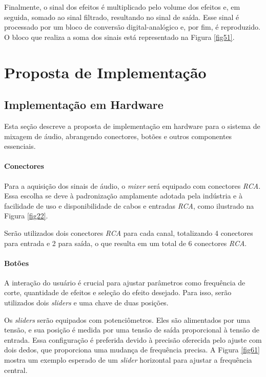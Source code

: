 Finalmente, o sinal dos efeitos é multiplicado pelo volume dos efeitos e, em seguida, somado ao sinal filtrado, resultando no sinal de saída. Esse sinal é processado por um bloco de conversão digital-analógico e, por fim, é reproduzido. O bloco que realiza a soma dos sinais está representado na Figura \ref{fig51}.

\section{Proposta de Implementação}

\subsection{Implementação em Hardware}

Esta seção descreve a proposta de implementação em hardware para o sistema de mixagem de áudio, abrangendo conectores, botões e outros componentes essenciais.

\paragraph{Conectores}
Para a aquisição dos sinais de áudio, o \textit{mixer} será equipado com conectores \textit{RCA}. Essa escolha se deve à padronização amplamente adotada pela indústria e à facilidade de uso e disponibilidade de cabos e entradas \textit{RCA}, como ilustrado na Figura \ref{fig22}.

Serão utilizados dois conectores \textit{RCA} para cada canal, totalizando 4 conectores para entrada e 2 para saída, o que resulta em um total de 6 conectores \textit{RCA}.

\paragraph{Botões}
A interação do usuário é crucial para ajustar parâmetros como frequência de corte, quantidade de efeitos e seleção do efeito desejado. Para isso, serão utilizados dois \textit{sliders} e uma chave de duas posições.

Os \textit{sliders} serão equipados com potenciômetros. Eles são alimentados por uma tensão, e sua posição é medida por uma tensão de saída proporcional à tensão de entrada. Essa configuração é preferida devido à precisão oferecida pelo ajuste com dois dedos, que proporciona uma mudança de frequência precisa. A Figura \ref{fig61} mostra um exemplo esperado de um \textit{slider} horizontal para ajustar a frequência central.

